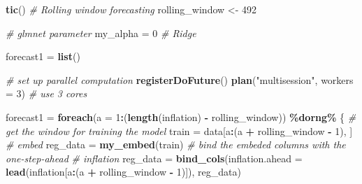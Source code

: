 \documentclass[
]{article}
\newenvironment{Shaded}{\begin{snugshade}}{\end{snugshade}}
\newcommand{\AttributeTok}[1]{\textcolor[rgb]{0.13,0.29,0.53}{#1}}
\newcommand{\CommentTok}[1]{\textcolor[rgb]{0.56,0.35,0.01}{\textit{#1}}}
\newcommand{\DecValTok}[1]{\textcolor[rgb]{0.00,0.00,0.81}{#1}}
\newcommand{\FunctionTok}[1]{\textcolor[rgb]{0.13,0.29,0.53}{\textbf{#1}}}
\newcommand{\NormalTok}[1]{#1}
\newcommand{\OtherTok}[1]{\textcolor[rgb]{0.56,0.35,0.01}{#1}}
\newcommand{\SpecialCharTok}[1]{\textcolor[rgb]{0.81,0.36,0.00}{\textbf{#1}}}
\newcommand{\StringTok}[1]{\textcolor[rgb]{0.31,0.60,0.02}{#1}}
\begin{document}
\begin{Shaded}
\begin{Highlighting}[]
\FunctionTok{tic}\NormalTok{()}
\CommentTok{\# Rolling window forecasting}
\NormalTok{rolling\_window }\OtherTok{\textless{}{-}} \DecValTok{492}

\CommentTok{\# glmnet parameter}
\NormalTok{my\_alpha }\OtherTok{=} \DecValTok{0}  \CommentTok{\# Ridge}

\NormalTok{forecast1 }\OtherTok{=} \FunctionTok{list}\NormalTok{()}

\CommentTok{\# set up parallel computation}
\FunctionTok{registerDoFuture}\NormalTok{()}
\FunctionTok{plan}\NormalTok{(}\StringTok{"multisession"}\NormalTok{, }\AttributeTok{workers =} \DecValTok{3}\NormalTok{)  }\CommentTok{\# use 3 cores }

\NormalTok{forecast1 }\OtherTok{=} \FunctionTok{foreach}\NormalTok{(}\AttributeTok{a =} \DecValTok{1}\SpecialCharTok{:}\NormalTok{(}\FunctionTok{length}\NormalTok{(inflation) }\SpecialCharTok{{-}}\NormalTok{ rolling\_window)) }\SpecialCharTok{\%dorng\%}
\NormalTok{    \{}
        \CommentTok{\# get the window for training the model}
\NormalTok{        train }\OtherTok{=}\NormalTok{ data[a}\SpecialCharTok{:}\NormalTok{(a }\SpecialCharTok{+}\NormalTok{ rolling\_window }\SpecialCharTok{{-}} \DecValTok{1}\NormalTok{), ]}
        \CommentTok{\# embed}
\NormalTok{        reg\_data }\OtherTok{=} \FunctionTok{my\_embed}\NormalTok{(train)}
        \CommentTok{\# bind the embeded columns with the one{-}step{-}ahead}
        \CommentTok{\# inflation}
\NormalTok{        reg\_data }\OtherTok{=} \FunctionTok{bind\_cols}\NormalTok{(}\AttributeTok{inflation.ahead =} \FunctionTok{lead}\NormalTok{(inflation[a}\SpecialCharTok{:}\NormalTok{(a }\SpecialCharTok{+}
\NormalTok{            rolling\_window }\SpecialCharTok{{-}} \DecValTok{1}\NormalTok{)]), reg\_data)}


\end{Highlighting}
\end{Shaded}
\end{document}
